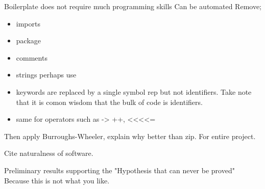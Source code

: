 Boilerplate does not require much programming skills
Can be automated 
Remove;
\begin{itemize}
\item imports
\item package
\item comments
\item strings perhaps use
\item keywords are replaced by a single symbol rep 
but not identifiers. Take note that it is comon wisdom that the bulk of code is identifiers.
\item same for operators such as -> ++, <<<<= 
\end{itemize}

Then apply Burroughs-Wheeler, explain why better than zip.
For entire project.

Cite naturalness of software.

Preliminary results supporting the 
"Hypothesis that can never be proved"
Because this is not what you like.

